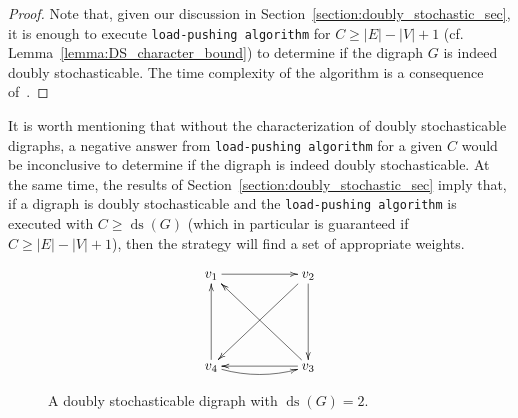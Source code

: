 \documentclass[final]{siamltex}
\begin{document}
\begin{proof}
  
  
  
  
  
  
  
  
  
  
  
  
  
  
  
  
  
  
  
  
  
  
  
  
  
  Note that, given our discussion in
  Section~\ref{section:doubly_stochastic_sec}, it is enough to execute
  {\texttt{load-pushing algorithm}\xspace} for $ C \geq |E|-|V|+1$
  (cf. Lemma~\ref{lemma:DS_character_bound}) to determine if the
  digraph $G$ is indeed doubly stochasticable. The time complexity of
  the algorithm is a consequence of~\cite[Theorem 3.11]{AVG-RET:88}.
\end{proof}

It is worth mentioning that without the characterization of doubly
stochasticable digraphs, a negative answer from {\texttt{load-pushing algorithm}\xspace} for a given
$C$ would be inconclusive to determine if the digraph is indeed doubly
stochasticable. At the same time, the results of
Section~\ref{section:doubly_stochastic_sec} imply that, if a digraph
is doubly stochasticable and the {\texttt{load-pushing algorithm}\xspace} is executed with $C \geq
{\operatorname{ds}}(G)$ (which in particular is guaranteed if $C \geq |E|-|V|+1$),
then the strategy will find a set of appropriate weights.

\begin{figure}[hbt]
  \[
  \xymatrix{v_1 \ar[rr]  &&  v_2 \ar[dd] \ar[ddll] \\
    &&\\
    v_4 \ar[uu] \ar@/_/[rr] && v_3 \ar[ll] \ar[lluu] }
  \]
  \caption{A doubly stochasticable digraph with $
    {\operatorname{ds}}(G)=2$.}\label{fig:cregular_ex}
\end{figure}
\end{document}

